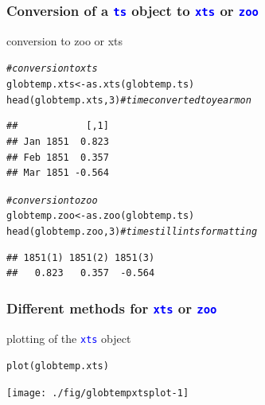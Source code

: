 \documentclass[xcolor=table, xcolor=dvipsnames]{beamer}\usepackage[]{graphicx}\usepackage[]{color}
\makeatletter
\newcommand{\hlnum}[1]{\textcolor[rgb]{0,0,0}{#1}}
\newcommand{\hlcom}[1]{\textcolor[rgb]{0,0.392,0}{\textit{#1}}}
\newcommand{\hlstd}[1]{\textcolor[rgb]{0,0,0}{#1}}
\newcommand{\hlkwb}[1]{\textcolor[rgb]{0,0,0}{#1}}
\newcommand{\hlkwd}[1]{\textcolor[rgb]{0,0,1}{#1}}
\newenvironment{kframe}{%
 \def\at@end@of@kframe{}%
 \ifinner\ifhmode%
  \def\at@end@of@kframe{\end{minipage}}%
  \begin{minipage}{\columnwidth}%
 \fi\fi%
 \def\FrameCommand##1{\hskip\@totalleftmargin \hskip-\fboxsep
 \colorbox{shadecolor}{##1}\hskip-\fboxsep
     \hskip-\linewidth \hskip-\@totalleftmargin \hskip\columnwidth}%
 \MakeFramed {\advance\hsize-\width
   \@totalleftmargin\z@ \linewidth\hsize
   \@setminipage}}%
 {\par\unskip\endMakeFramed%
 \at@end@of@kframe}
\newenvironment{knitrout}{}{} %
\newcommand{\rcode}[1]{\texttt{\textcolor{Blue}{#1}}} %
\makeatother
\begin{document}
\begin{frame}[fragile]\frametitle{Conversion of a \rcode{ts} object to \rcode{xts} or \rcode{zoo}}
conversion to zoo or xts %
\begin{knitrout}
\color{fgcolor}\begin{kframe}
\begin{alltt}
\hlcom{# conversion to xts}
\hlstd{globtemp.xts} \hlkwb{<-} \hlkwd{as.xts}\hlstd{(globtemp.ts)}
\hlkwd{head}\hlstd{(globtemp.xts,}\hlnum{3}\hlstd{)} \hlcom{# time converted to yearmon}
\end{alltt}
\begin{verbatim}
##            [,1]
## Jan 1851  0.823
## Feb 1851  0.357
## Mar 1851 -0.564
\end{verbatim}
\begin{alltt}
\hlcom{# conversion to zoo}
\hlstd{globtemp.zoo} \hlkwb{<-} \hlkwd{as.zoo}\hlstd{(globtemp.ts)}
\hlkwd{head}\hlstd{(globtemp.zoo,}\hlnum{3}\hlstd{)} \hlcom{# time still in ts formatting}
\end{alltt}
\begin{verbatim}
## 1851(1) 1851(2) 1851(3) 
##   0.823   0.357  -0.564
\end{verbatim}
\end{kframe}
\end{knitrout}
\end{frame}


\begin{frame}[fragile]\frametitle{Different methods for \rcode{xts} or \rcode{zoo}}
plotting of the \rcode{xts} object %
\begin{knitrout}
\color{fgcolor}\begin{kframe}
\begin{alltt}
\hlkwd{plot}\hlstd{(globtemp.xts)}
\end{alltt}
\end{kframe}

{\centering \texttt{[image: ./fig/globtempxtsplot-1]} 

}



\end{knitrout}
\end{frame}

\end{document}
